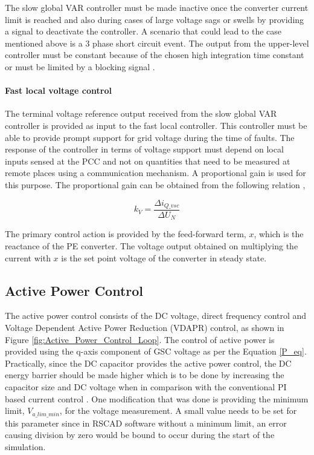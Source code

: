 The slow global VAR controller must be made inactive once the converter current limit is reached and also during cases of large voltage sags or swells by providing a signal to deactivate the controller. A scenario that could lead to the case mentioned above is a 3 phase short circuit event. The output from the upper-level controller must be constant because of the chosen high integration time constant or must be limited by a blocking signal \cite{korai_dynamic_2019}.

\paragraph{Fast local voltage control}
The terminal voltage reference output received from the slow global VAR controller is provided as input to the fast local controller. This controller must be able to provide prompt support for grid voltage during the time of faults. The response of the controller in terms of voltage support must depend on local inputs sensed at the \gls{PCC} and not on quantities that need to be measured at remote places using a communication mechanism. A proportional gain is used for this purpose. The proportional gain can be obtained from the following relation \cite{korai_dynamic_2019},

\begin{equation}
    k_V = \frac{\Delta i_{Q\_vsc}}{\Delta U_N }
\end{equation}

The primary control action is provided by the feed-forward term, $x$, which is the reactance of the \gls{PE} converter. The voltage output obtained on multiplying the current with $x$ is the set point voltage of the converter in steady state.

\subsection{Active Power Control}\label{Active_power_DVC_theory}
The active power control consists of the \gls{DC} voltage, direct frequency control and Voltage Dependent Active Power Reduction (VDAPR) control, as shown in Figure \ref{fig:Active_Power_Control_Loop}. The control of active power is provided using the q-axis component of \gls{GSC} voltage as per the Equation \ref{P_eq}. Practically, since the \gls{DC} capacitor provides the active power control, the \gls{DC} energy barrier should be made higher which is to be done by increasing the capacitor size and \gls{DC} voltage when in comparison with the conventional \gls{PI} based current control \cite{korai_dynamic_2019}. One modification that was done is providing the minimum limit, $V_{a\_lim\_min}$, for the voltage measurement. A small value needs to be set for this parameter since in RSCAD software without a minimum limit, an error causing division by zero would be bound to occur during the start of the simulation. 

